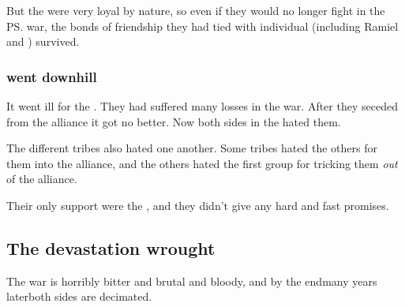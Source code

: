 But the \vorcanths{} were very loyal by nature, so even if they would no longer fight in the \ps{\resphain} war, the bonds of friendship they had tied with individual \resphain{} (including Ramiel and \Shiaraid) survived. 





\subsubsection[Aryothim went downhill]{\Aryothim{} went downhill}
It went ill for the \aryothim. 
They had suffered many losses in the war. 
After they seceded from the alliance it got no better. 
Now both sides in the \feud{} hated them. 

The different \aryoth{} tribes also hated one another. 
Some tribes hated the others for  them into the alliance, and the others hated the first group for tricking them \emph{out} of the alliance. 

Their only support were the \vorcanths, and they didn't give any hard and fast promises. 









\subsection{The devastation wrought}
The war is horribly bitter and brutal and bloody, and by the end\dash many years later\dash both sides are decimated. 






